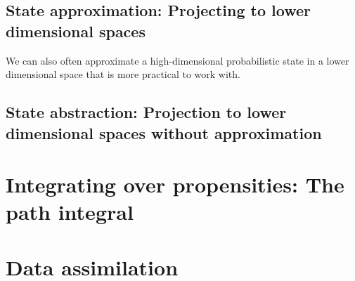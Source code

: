 \documentclass[letterpaper,twocolumn,10pt]{article}
\begin{document}
\subsection{State approximation: Projecting to lower dimensional spaces}

We can also often approximate a high-dimensional probabilistic state in a lower dimensional space that is more practical to work with.

\subsection{State abstraction: Projection to lower dimensional spaces without approximation}


\section{Integrating over propensities: The path integral}

\section{Data assimilation}
\end{document}
